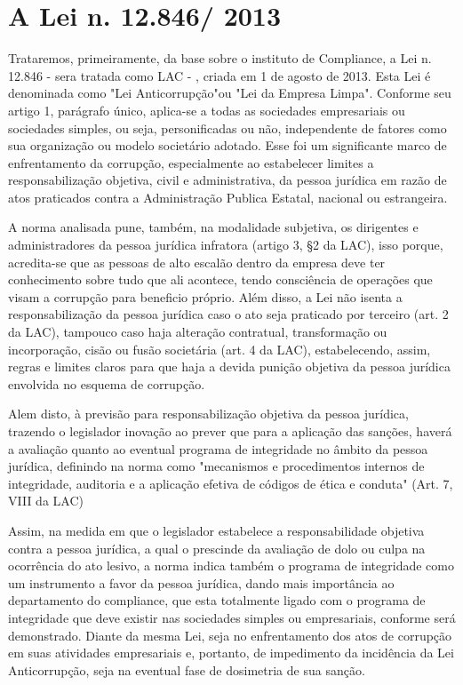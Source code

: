 \chapter{A Lei n. 12.846/ 2013}

Trataremos, primeiramente, da base sobre o instituto de Compliance, a Lei n. 12.846 - sera tratada como LAC - , criada em 1 de agosto de 2013. Esta Lei é denominada como "Lei Anticorrupção"ou "Lei da Empresa Limpa". Conforme seu artigo 1, parágrafo único, aplica-se a todas as sociedades empresariais ou sociedades simples, ou seja, personificadas ou não, independente de fatores como sua organização ou modelo societário adotado. Esse foi um significante marco de enfrentamento da corrupção, especialmente ao estabelecer limites a responsabilização objetiva, civil e administrativa, da pessoa jurídica em razão de atos praticados contra a Administração Publica Estatal, nacional ou estrangeira. 

A norma analisada pune, também, na modalidade subjetiva, os dirigentes e administradores da pessoa jurídica infratora (artigo 3, §2 da LAC), isso porque, acredita-se que as pessoas de alto escalão dentro da empresa deve ter conhecimento sobre tudo que ali acontece, tendo consciência de operações que visam a corrupção para beneficio próprio. Além disso, a Lei não isenta a responsabilização da pessoa jurídica caso o ato seja praticado por terceiro (art. 2 da LAC), tampouco caso haja alteração contratual, transformação ou incorporação, cisão ou fusão societária (art. 4 da LAC), estabelecendo, assim, regras e limites claros para que haja a devida punição objetiva da pessoa jurídica envolvida no esquema de corrupção. 

Alem disto, à previsão para responsabilização objetiva da pessoa jurídica, trazendo o legislador inovação ao prever que para a aplicação das sanções, haverá a avaliação quanto ao eventual programa de integridade no âmbito da pessoa jurídica, definindo na norma como "mecanismos e procedimentos internos de integridade, auditoria e a aplicação efetiva de códigos de ética e conduta" (Art. 7, VIII da LAC)

Assim, na medida em que o legislador estabelece a responsabilidade objetiva contra a pessoa jurídica, a qual o prescinde da avaliação de dolo ou culpa na ocorrência do ato lesivo, a norma indica também o programa de integridade como um instrumento a favor da pessoa jurídica, dando mais importância ao departamento do compliance, que esta totalmente ligado com o programa de integridade que deve existir nas sociedades simples ou empresariais, conforme será demonstrado. Diante da mesma Lei, seja no enfrentamento dos atos de corrupção em suas atividades empresariais e, portanto, de impedimento da incidência da Lei Anticorrupção, seja na eventual fase de dosimetria de sua sanção. 

